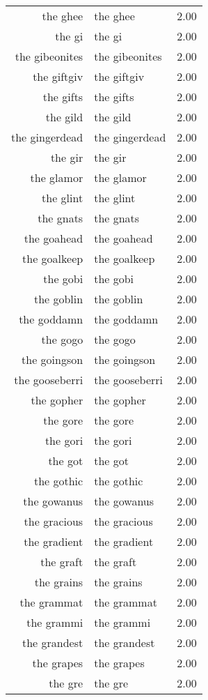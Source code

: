 \begin{table}[ht]
\begin{tabular}{rlr}
  the ghee & the ghee & 2.00 \\ 
  the gi & the gi & 2.00 \\ 
  the gibeonites & the gibeonites & 2.00 \\ 
  the giftgiv & the giftgiv & 2.00 \\ 
  the gifts & the gifts & 2.00 \\ 
  the gild & the gild & 2.00 \\ 
  the gingerdead & the gingerdead & 2.00 \\ 
  the gir & the gir & 2.00 \\ 
  the glamor & the glamor & 2.00 \\ 
  the glint & the glint & 2.00 \\ 
  the gnats & the gnats & 2.00 \\ 
  the goahead & the goahead & 2.00 \\ 
  the goalkeep & the goalkeep & 2.00 \\ 
  the gobi & the gobi & 2.00 \\ 
  the goblin & the goblin & 2.00 \\ 
  the goddamn & the goddamn & 2.00 \\ 
  the gogo & the gogo & 2.00 \\ 
  the goingson & the goingson & 2.00 \\ 
  the gooseberri & the gooseberri & 2.00 \\ 
  the gopher & the gopher & 2.00 \\ 
  the gore & the gore & 2.00 \\ 
  the gori & the gori & 2.00 \\ 
  the got & the got & 2.00 \\ 
  the gothic & the gothic & 2.00 \\ 
  the gowanus & the gowanus & 2.00 \\ 
  the gracious & the gracious & 2.00 \\ 
  the gradient & the gradient & 2.00 \\ 
  the graft & the graft & 2.00 \\ 
  the grains & the grains & 2.00 \\ 
  the grammat & the grammat & 2.00 \\ 
  the grammi & the grammi & 2.00 \\ 
  the grandest & the grandest & 2.00 \\ 
  the grapes & the grapes & 2.00 \\ 
  the gre & the gre & 2.00 \\ 

\end{tabular}
\end{table}
